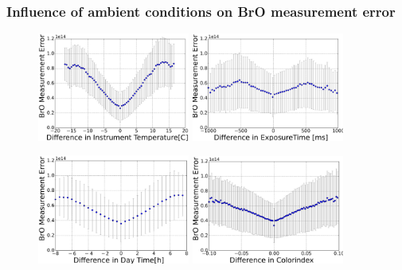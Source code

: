 \documentclass{beamer} %
\begin{document}
		\begin{frame}
			\frametitle{\color{mygreen}Influence of ambient conditions on BrO measurement error\\%
				\color{mygreen}{\rule{0.8\textwidth}{2pt}}}
			\vspace{-0.2cm}
			\begin{multicols}{2}
				
				\begin{figure}[htbp] 
					
					\includegraphics[width=5cm]{../../Bilder/Differcence_inTemperature[C]}
					\vspace{0.01cm}
					\includegraphics[width=5cm]{../../Bilder/Differcence_inExposureTime[ms]}
				\end{figure}
				\begin{figure}[htbp] 
					\includegraphics[width=5cm]{../../Bilder/Differcence_in_DayTime[h]a}
					\vspace{0.01cm}
					\includegraphics[width=5cm]{../../Bilder/Differcence_inColorindex}
				\end{figure}
				

\end{multicols}
\end{frame}
\end{document}
